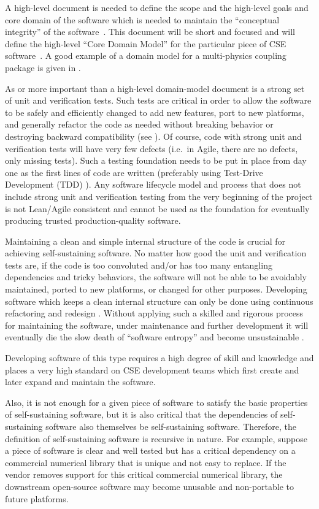 \documentclass[11pt]{SANDreport}
\begin{document}
A high-level document is needed to define the scope and the high-level
goals and core domain of the software which is needed to maintain the
``conceptual integrity'' of the software~\cite{MythicalManMonth95}.
This document will be short and focused and will define the high-level
``Core Domain Model'' for the particular piece of CSE
software~\cite{DomainDrivenDesign}.  A good example of a domain model
for a multi-physics coupling package is given in {}\cite{LIMEtheory}.

As or more important than a high-level domain-model document is a
strong set of unit and verification tests.  Such tests are critical in
order to allow the software to be safely and efficiently changed to
add new features, port to new platforms, and generally refactor the
code as needed without breaking behavior or destroying backward
compatibility (see {}\cite{WorkingEffectivelyWithLegacyCode05}).  Of
course, code with strong unit and verification tests will have very
few defects (i.e.\ in Agile, there are no defects, only missing
tests).  Such a testing foundation needs to be put in place from day
one as the first lines of code are written (preferably using
Test-Drive Development (TDD) {}\cite{TDD}).  Any software lifecycle
model and process that does not include strong unit and verification
testing from the very beginning of the project is not Lean/Agile
consistent and cannot be used as the foundation for eventually
producing trusted production-quality software.

Maintaining a clean and simple internal structure of the code is
crucial for achieving self-sustaining software.  No matter how good the
unit and verification tests are, if the code is too convoluted and/or
has too many entangling dependencies and tricky behaviors, the
software will not be able to be avoidably maintained, ported to new
platforms, or changed for other purposes.  Developing software which
keeps a clean internal structure can only be done using continuous
refactoring and redesign {}\cite{XP2}.  Without applying such a
skilled and rigorous process for maintaining the software, under
maintenance and further development it will eventually die the slow
death of ``software entropy'' and become unsustainable
{}\cite{MythicalManMonth95}.

Developing software of this type requires a high degree of skill and
knowledge and places a very high standard on CSE development teams
which first create and later expand and maintain the software.

Also, it is not enough for a given piece of software to satisfy the
basic properties of self-sustaining software, but it is also critical
that the dependencies of self-sustaining software also themselves be
self-sustaining software. Therefore, the definition of self-sustaining
software is recursive in nature.  For example, suppose a piece of
software is clear and well tested but has a critical dependency on a
commercial numerical library that is unique and not easy to replace.
If the vendor removes support for this critical commercial numerical
library, the downstream open-source software may become unusable and
non-portable to future platforms.
\end{document}
